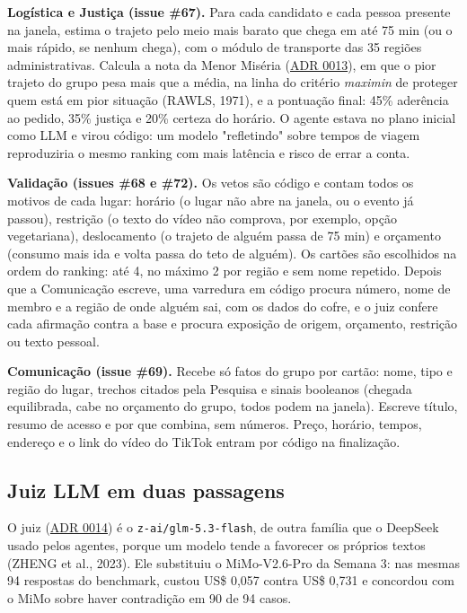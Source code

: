\documentclass[12pt,a4paper]{article}
\begin{document}
\textbf{Logística e Justiça (issue \#67).} Para cada candidato e cada pessoa presente na janela, estima o trajeto pelo meio mais barato que chega em até 75 min (ou o mais rápido, se nenhum chega), com o módulo de transporte das 35 regiões administrativas. Calcula a nota da Menor Miséria (\href{https://github.com/Residencia-IA-Challenge-2-Grupo-7/residencia-ia-g7-challenge2/blob/main/docs/decisoes/0013-deslocamento-e-menor-miseria.md}{ADR 0013}), em que o pior trajeto do grupo pesa mais que a média, na linha do critério \textit{maximin} de proteger quem está em pior situação (RAWLS, 1971), e a pontuação final: 45\% aderência ao pedido, 35\% justiça e 20\% certeza do horário. O agente estava no plano inicial como LLM e virou código: um modelo "refletindo" sobre tempos de viagem reproduziria o mesmo ranking com mais latência e risco de errar a conta.

\textbf{Validação (issues \#68 e \#72).} Os vetos são código e contam todos os motivos de cada lugar: horário (o lugar não abre na janela, ou o evento já passou), restrição (o texto do vídeo não comprova, por exemplo, opção vegetariana), deslocamento (o trajeto de alguém passa de 75 min) e orçamento (consumo mais ida e volta passa do teto de alguém). Os cartões são escolhidos na ordem do ranking: até 4, no máximo 2 por região e sem nome repetido. Depois que a Comunicação escreve, uma varredura em código procura número, nome de membro e a região de onde alguém sai, com os dados do cofre, e o juiz confere cada afirmação contra a base e procura exposição de origem, orçamento, restrição ou texto pessoal.

\textbf{Comunicação (issue \#69).} Recebe só fatos do grupo por cartão: nome, tipo e região do lugar, trechos citados pela Pesquisa e sinais booleanos (chegada equilibrada, cabe no orçamento do grupo, todos podem na janela). Escreve título, resumo de acesso e por que combina, sem números. Preço, horário, tempos, endereço e o link do vídeo do TikTok entram por código na finalização.

\subsection{Juiz LLM em duas passagens}
O juiz (\href{https://github.com/Residencia-IA-Challenge-2-Grupo-7/residencia-ia-g7-challenge2/blob/main/docs/decisoes/0014-juiz-glm-5.3-flash.md}{ADR 0014}) é o \texttt{z-ai/glm-5.3-flash}, de outra família que o DeepSeek usado pelos agentes, porque um modelo tende a favorecer os próprios textos (ZHENG et al., 2023). Ele substituiu o MiMo-V2.6-Pro da Semana 3: nas mesmas 94 respostas do benchmark, custou US\$ 0,057 contra US\$ 0,731 e concordou com o MiMo sobre haver contradição em 90 de 94 casos.
\end{document}
